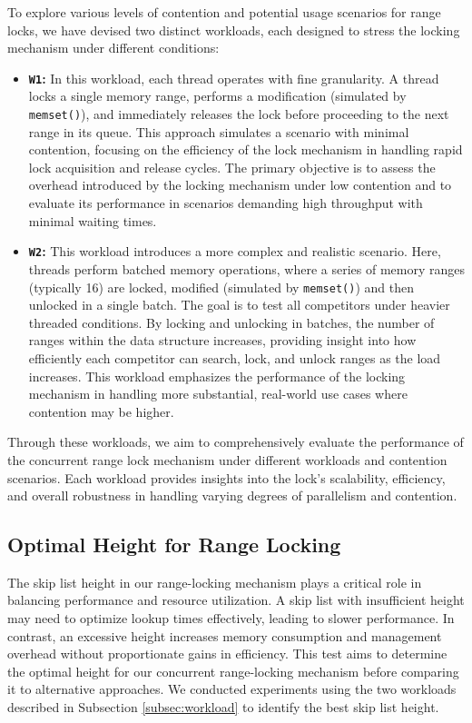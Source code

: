 To explore various levels of contention and potential usage scenarios for range locks, we have devised two distinct workloads, each designed to stress the locking mechanism under different conditions:

\begin{itemize} 
    \item \textbf{\texttt{W1}:} In this workload, each thread operates with fine granularity. 
    A thread locks a single memory range, performs a modification (simulated by \texttt{memset()}), and immediately releases the lock before proceeding to the next range in its queue. 
    This approach simulates a scenario with minimal contention, focusing on the efficiency of the lock mechanism in handling rapid lock acquisition and release cycles. 
    The primary objective is to assess the overhead introduced by the locking mechanism under low contention and to evaluate its performance in scenarios demanding high throughput with minimal waiting times.
    
    \item \textbf{\texttt{W2}:} This workload introduces a more complex and realistic scenario. 
    Here, threads perform batched memory operations, where a series of memory ranges (typically 16) are locked, modified (simulated by \texttt{memset()}) and then unlocked in a single batch. 
    The goal is to test all competitors under heavier threaded conditions. 
    By locking and unlocking in batches, the number of ranges within the data structure increases, providing insight into how efficiently each competitor can search, lock, and unlock ranges as the load increases. 
    This workload emphasizes the performance of the locking mechanism in handling more substantial, real-world use cases where contention may be higher.
\end{itemize}

Through these workloads, we aim to comprehensively evaluate the performance of the concurrent range lock mechanism under different workloads and contention scenarios. 
Each workload provides insights into the lock's scalability, efficiency, and overall robustness in handling varying degrees of parallelism and contention.

\subsection{Optimal Height for Range Locking}

The skip list height in our range-locking mechanism plays a critical role in balancing performance and resource utilization. 
A skip list with insufficient height may need to optimize lookup times effectively, leading to slower performance. 
In contrast, an excessive height increases memory consumption and management overhead without proportionate gains in efficiency. 
This test aims to determine the optimal height for our concurrent range-locking mechanism before comparing it to alternative approaches. 
We conducted experiments using the two workloads described in Subsection \ref{subsec:workload} to identify the best skip list height.

